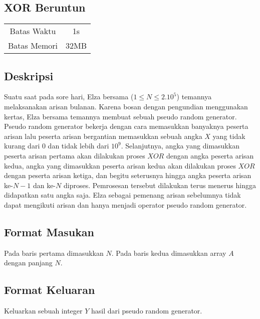 \documentclass{article}
\begin{document}
\begin{center}
    \section*{XOR Beruntun} %

    \begin{tabular}{ | c c | }
        \hline
        Batas Waktu  & 1s \\    %
        Batas Memori & 32MB \\  %
        \hline
    \end{tabular}
\end{center}

\subsection*{Deskripsi}

Suatu saat pada sore hari, Elza bersama ($1 \leq N \leq 2.10^5$) temannya melaksanakan arisan bulanan.
Karena bosan dengan pengundian menggunakan kertas, Elza bersama temannya membuat sebuah pseudo random generator.
Pseudo random generator bekerja dengan cara memasukkan banyaknya peserta arisan lalu peserta arisan bergantian memasukkan sebuah angka $X$ yang tidak kurang dari 0 dan tidak lebih dari $10^9$.
Selanjutnya, angka yang dimasukkan peserta arisan pertama akan dilakukan proses $XOR$ dengan angka peserta arisan kedua, 
angka yang dimasukkan peserta arisan kedua akan dilakukan proses $XOR$ dengan peserta arisan ketiga, 
dan begitu seterusnya hingga angka peserta arisan ke-$N - 1$ dan ke-$N$ diproses.
Pemrosesan tersebut dilakukan terus menerus hingga didapatkan satu angka saja.
Elza sebagai pemenang arisan sebelumnya tidak dapat mengikuti arisan dan hanya menjadi operator pseudo random generator.

\subsection*{Format Masukan}

Pada baris pertama dimasukkan $N$.
Pada baris kedua dimasukkan array $A$ dengan panjang $N$.

\subsection*{Format Keluaran}

Keluarkan sebuah integer $Y$ hasil dari pseudo random generator.
\\
\end{document}
